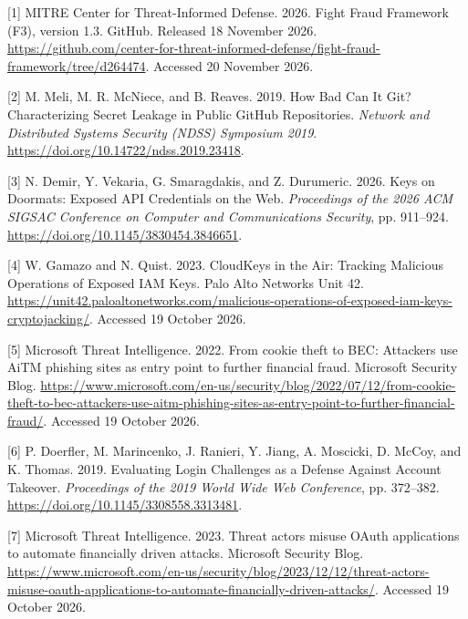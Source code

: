 \documentclass[
  11pt,
]{article}
\newlength{\cslhangindent}
\newlength{\cslentryspacingunit} %
\newenvironment{CSLReferences}[2] %
 {%
  \setlength{\parindent}{0pt}
  \ifodd #1
  \let\oldpar\par
  \def\par{\hangindent=\cslhangindent\oldpar}
  \fi
  \setlength{\parskip}{#2\cslentryspacingunit}
 }%
 {}
\begin{document}
\hypertarget{refs}{}
\begin{CSLReferences}{1}{1}
\leavevmode{}%
{[}1{]} MITRE Center for Threat-Informed Defense. 2026. Fight Fraud
Framework (F3), version 1.3. GitHub. Released 18 November 2026.
\url{https://github.com/center-for-threat-informed-defense/fight-fraud-framework/tree/d264474}.
Accessed 20 November 2026.

\leavevmode{}%
{[}2{]} M. Meli, M. R. McNiece, and B. Reaves. 2019. How Bad Can It Git?
Characterizing Secret Leakage in Public GitHub Repositories.
\emph{Network and Distributed Systems Security (NDSS) Symposium 2019}.
\url{https://doi.org/10.14722/ndss.2019.23418}.

\leavevmode{}%
{[}3{]} N. Demir, Y. Vekaria, G. Smaragdakis, and Z. Durumeric. 2026.
Keys on Doormats: Exposed API Credentials on the Web. \emph{Proceedings
of the 2026 ACM SIGSAC Conference on Computer and Communications
Security}, pp. 911--924. \url{https://doi.org/10.1145/3830454.3846651}.

\leavevmode{}%
{[}4{]} W. Gamazo and N. Quist. 2023. CloudKeys in the Air: Tracking
Malicious Operations of Exposed IAM Keys. Palo Alto Networks Unit 42.
\url{https://unit42.paloaltonetworks.com/malicious-operations-of-exposed-iam-keys-cryptojacking/}.
Accessed 19 October 2026.

\leavevmode{}%
{[}5{]} Microsoft Threat Intelligence. 2022. From cookie theft to BEC:
Attackers use AiTM phishing sites as entry point to further financial
fraud. Microsoft Security Blog.
\url{https://www.microsoft.com/en-us/security/blog/2022/07/12/from-cookie-theft-to-bec-attackers-use-aitm-phishing-sites-as-entry-point-to-further-financial-fraud/}.
Accessed 19 October 2026.

\leavevmode{}%
{[}6{]} P. Doerfler, M. Marincenko, J. Ranieri, Y. Jiang, A. Moscicki,
D. McCoy, and K. Thomas. 2019. Evaluating Login Challenges as a Defense
Against Account Takeover. \emph{Proceedings of the 2019 World Wide Web
Conference}, pp. 372--382.
\url{https://doi.org/10.1145/3308558.3313481}.

\leavevmode{}%
{[}7{]} Microsoft Threat Intelligence. 2023. Threat actors misuse OAuth
applications to automate financially driven attacks. Microsoft Security
Blog.
\url{https://www.microsoft.com/en-us/security/blog/2023/12/12/threat-actors-misuse-oauth-applications-to-automate-financially-driven-attacks/}.
Accessed 19 October 2026.


\end{CSLReferences}
\end{document}
